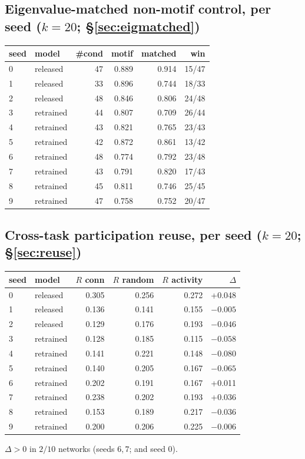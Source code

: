 \documentclass[11pt]{article}
\begin{document}
\subsection{Eigenvalue-matched non-motif control, per seed ($k=20$; \S\ref{sec:eigmatched})}
\begin{center}\small
\begin{tabular}{llrrrr}
\toprule
seed & model & \#cond & motif & matched & win \\
\midrule
0 & released & 47 & 0.889 & 0.914 & 15/47 \\
1 & released & 33 & 0.896 & 0.744 & 18/33 \\
2 & released & 48 & 0.846 & 0.806 & 24/48 \\
3 & retrained & 44 & 0.807 & 0.709 & 26/44 \\
4 & retrained & 43 & 0.821 & 0.765 & 23/43 \\
5 & retrained & 42 & 0.872 & 0.861 & 13/42 \\
6 & retrained & 48 & 0.774 & 0.792 & 23/48 \\
7 & retrained & 43 & 0.791 & 0.820 & 17/43 \\
8 & retrained & 45 & 0.811 & 0.746 & 25/45 \\
9 & retrained & 47 & 0.758 & 0.752 & 20/47 \\
\bottomrule
\end{tabular}
\end{center}

\subsection{Cross-task participation reuse, per seed ($k=20$; \S\ref{sec:reuse})}
\begin{center}\small
\begin{tabular}{llrrrr}
\toprule
seed & model & $R$ conn & $R$ random & $R$ activity & $\Delta$ \\
\midrule
0 & released & 0.305 & 0.256 & 0.272 & +0.048 \\
1 & released & 0.136 & 0.141 & 0.155 & $-0.005$ \\
2 & released & 0.129 & 0.176 & 0.193 & $-0.046$ \\
3 & retrained & 0.128 & 0.185 & 0.115 & $-0.058$ \\
4 & retrained & 0.141 & 0.221 & 0.148 & $-0.080$ \\
5 & retrained & 0.140 & 0.205 & 0.167 & $-0.065$ \\
6 & retrained & 0.202 & 0.191 & 0.167 & +0.011 \\
7 & retrained & 0.238 & 0.202 & 0.193 & +0.036 \\
8 & retrained & 0.153 & 0.189 & 0.217 & $-0.036$ \\
9 & retrained & 0.200 & 0.206 & 0.225 & $-0.006$ \\
\bottomrule
\end{tabular}
\end{center}
$\Delta>0$ in $2/10$ networks (seeds $6,7$; and seed $0$).
\end{document}
